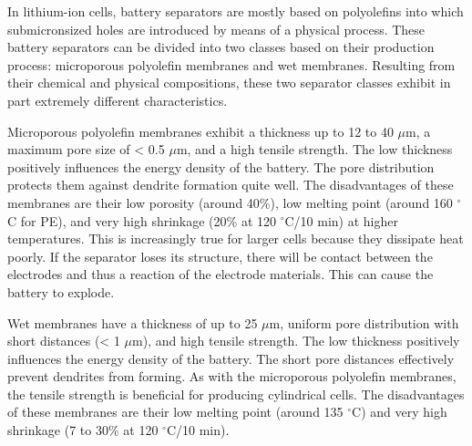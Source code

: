 In lithium-ion cells, battery separators are mostly based on polyolefins into which submicronsized holes are introduced by means of a physical process. These battery separators can be divided into two classes based on their production process: microporous polyolefin membranes and wet membranes.
Resulting from their chemical and physical compositions, these two separator classes exhibit in part extremely different characteristics.

Microporous polyolefin membranes exhibit a thickness up to 12 to 40 $\mu$m, a maximum pore size of < 0.5 $\mu$m, and a high tensile strength. The low thickness positively influences the energy density of the battery. The pore distribution protects them against dendrite formation quite well. The disadvantages of these membranes are their low porosity (around 40\%), low melting point (around 160 $^\circ$C for PE), and very high shrinkage (20\% at 120 $^\circ$C/10 min) at higher temperatures. This is increasingly true for larger cells because they dissipate heat poorly. If the separator loses its structure, there will be contact between the electrodes and thus a reaction of the electrode materials. This can cause the battery to explode.

Wet membranes have a thickness of up to 25 $\mu$m, uniform pore distribution with short distances (< 1 $\mu$m), and high tensile strength. The low thickness positively influences the energy density of the battery. The short pore distances effectively prevent dendrites from forming. As with the microporous polyolefin membranes, the tensile strength is beneficial for producing cylindrical cells. The disadvantages of these membranes are their low melting point (around 135 $^\circ$C) and very high shrinkage (7 to 30\% at 120 $^\circ$C/10 min).

